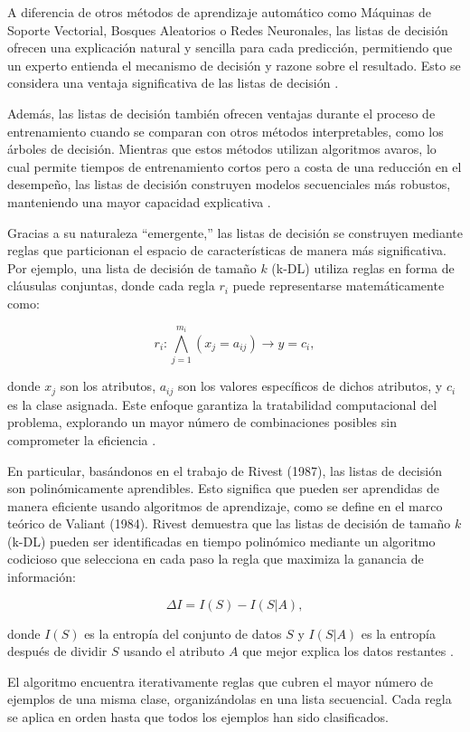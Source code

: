 A diferencia de otros métodos de aprendizaje automático como Máquinas de Soporte Vectorial, Bosques Aleatorios o Redes Neuronales, las listas de decisión ofrecen una explicación natural y sencilla para cada predicción, permitiendo que un experto entienda el mecanismo de decisión y razone sobre el resultado. Esto se considera una ventaja significativa de las listas de decisión \cite{Letham-2015}.

Además, las listas de decisión también ofrecen ventajas durante el proceso de entrenamiento cuando se comparan con otros métodos interpretables, como los árboles de decisión. Mientras que estos métodos utilizan algoritmos avaros, lo cual permite tiempos de entrenamiento cortos pero a costa de una reducción en el desempeño, las listas de decisión construyen modelos secuenciales más robustos, manteniendo una mayor capacidad explicativa \cite{Liu-2015}.

Gracias a su naturaleza “emergente,” las listas de decisión se construyen mediante reglas que particionan el espacio de características de manera más significativa. Por ejemplo, una lista de decisión de tamaño \(k\) (k-DL) utiliza reglas en forma de cláusulas conjuntas, donde cada regla \(r_i\) puede representarse matemáticamente como:

\[
r_i : \bigwedge_{j=1}^{m_i} (x_j = a_{ij}) \rightarrow y = c_i,
\]

donde \(x_j\) son los atributos, \(a_{ij}\) son los valores específicos de dichos atributos, y \(c_i\) es la clase asignada. Este enfoque garantiza la tratabilidad computacional del problema, explorando un mayor número de combinaciones posibles sin comprometer la eficiencia \cite{Letham-2015}.

En particular, basándonos en el trabajo de Rivest (1987), las listas de decisión son polinómicamente aprendibles. Esto significa que pueden ser aprendidas de manera eficiente usando algoritmos de aprendizaje, como se define en el marco teórico de Valiant (1984). Rivest demuestra que las listas de decisión de tamaño \(k\) (k-DL) pueden ser identificadas en tiempo polinómico mediante un algoritmo codicioso que selecciona en cada paso la regla que maximiza la ganancia de información:

\[
\Delta I = I(S) - I(S|A),
\]

donde \(I(S)\) es la entropía del conjunto de datos \(S\) y \(I(S|A)\) es la entropía después de dividir \(S\) usando el atributo \(A\) que mejor explica los datos restantes \cite{Rivest-1987}.

El algoritmo encuentra iterativamente reglas que cubren el mayor número de ejemplos de una misma clase, organizándolas en una lista secuencial. Cada regla se aplica en orden hasta que todos los ejemplos han sido clasificados.

